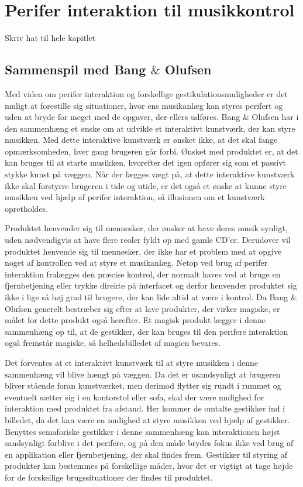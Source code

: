 \chapter{Perifer interaktion til musikkontrol}
\label{PeriferInteraktionTilMusikKontrol}
%
Skriv hat til hele kapitlet

\section{Sammenspil med Bang $\&$ Olufsen}
\label{SammenspilMedBO}
%
Med viden om perifer interaktion og forskellige gestikulationsmuligheder er det muligt at forestille sig situationer, hvor ens musikanlæg kan styres perifert og uden at bryde for meget med de opgaver, der ellers udføres. Bang $\&$ Olufsen har i den sammenhæng et ønske om at udvikle et interaktivt kunstværk, der kan styre musikken. Med dette interaktive kunstværk er ønsket ikke, at det skal fange opmærksomheden, hver gang brugeren går forbi. Ønsket med produktet er, at det kan bruges til at starte musikken, hvorefter det igen opfører sig som et passivt stykke kunst på væggen. Når der lægges vægt på, at dette interaktive kunstværk ikke skal forstyrre brugeren i tide og utide, er det også et ønske at kunne styre musikken ved hjælp af perifer interaktion, så illusionen om et kunstværk opretholdes. 

Produktet henvender sig til mennesker, der ønsker at have deres musik synligt, uden nødvendigvis at have flere reoler fyldt op med gamle CD'er. Derudover vil produktet henvende sig til mennesker, der ikke har et problem med at opgive noget af kontrollen ved at styre et musikanlæg. Netop ved brug af perifer interaktion fralægges den præcise kontrol, der normalt haves ved at bruge en fjernbetjening eller trykke direkte på interfacet og derfor henvender produktet sig ikke i lige så høj grad til brugere, der kan lide altid at være i kontrol. Da Bang $\&$ Olufsen generelt bestræber sig efter at lave produkter, der virker magiske, er målet for dette produkt også herefter. Et magisk produkt lægger i denne sammenhæng op til, at de gestikker, der kan bruges til den perifere interaktion også fremstår magiske, så helhedsbilledet af magien bevares. 

Det forventes at et interaktivt kunstværk til at styre musikken i denne sammenhæng vil blive hængt på væggen. Da det er usandsynligt at brugeren bliver stående foran kunstværket, men derimod flytter sig rundt i rummet og eventuelt sætter sig i en kontorstol eller sofa, skal der være mulighed for interaktion med produktet fra afstand. Her kommer de omtalte gestikker ind i billedet, da det kan være en mulighed at styre musikken ved hjælp af gestikker. Benyttes semaforiske gestikker i denne sammenhæng kan interaktionen højst sandsynligt forblive i det perifere, og på den måde brydes fokus ikke ved brug af en applikation eller fjernbetjening, der skal findes frem. Gestikker til styring af produkter kan bestemmes på forskellige måder, hvor det er vigtigt at tage højde for de forskellige brugssituationer der findes til produktet.  

